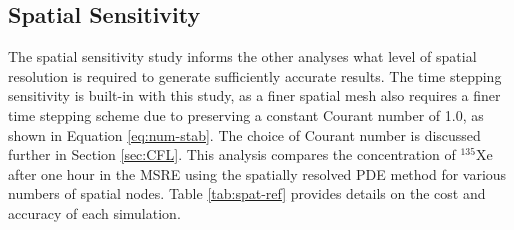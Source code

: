 \documentclass{style/nseJournal}
\begin{document}


\subsection{Spatial Sensitivity}
\label{sec:spatsens}

The spatial sensitivity study informs the other analyses what level of spatial resolution is required to generate sufficiently accurate results.
The time stepping sensitivity is built-in with this study, as a finer spatial mesh also requires a finer time stepping scheme due to preserving a constant Courant number of 1.0, as shown in Equation \eqref{eq:num-stab}.
The choice of Courant number is discussed further in Section \ref{sec:CFL}.
This analysis compares the concentration of $^{135}$Xe after one hour in the MSRE using the spatially resolved PDE method for various numbers of spatial nodes.
Table \ref{tab:spat-ref} provides details on the cost and accuracy of each simulation. 


\end{document}
